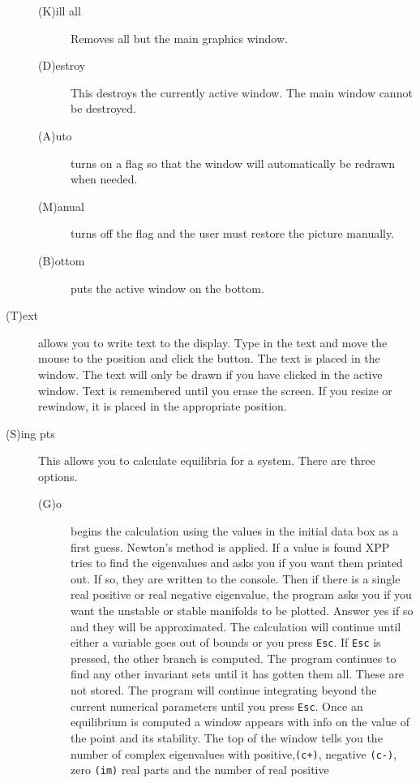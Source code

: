 \begin{description}
\begin{description}
\item[(K)ill all]  Removes all but the main graphics window.

\item[(D)estroy]  This destroys the currently active window.  The main window
 cannot be destroyed.  

\item[(A)uto] turns on a flag so that the window will automatically be
redrawn when needed.

\item[(M)anual] turns off the flag and the user must restore the picture manually.

\item[(B)ottom] puts the active window on the bottom.
\end{description}
\item[(T)ext] allows you to write text to the display.  Type in the text and move
 the mouse to the position and click the button.  The text is placed in the 
window.  The text will only be drawn if you have clicked in the active window.
  Text is remembered until you erase the screen.  If you resize or rewindow,
 it is placed in the appropriate position.
\item[(S)ing pts]  This allows you to calculate equilibria for a system. There
 are three options.
\begin{description} 
	\item[(G)o] begins the calculation   using the values in the initial 
data box as a first guess.  Newton's method is applied.  If a value is found XPP
 tries to find the eigenvalues and asks you if you want them printed out.  If so,
 they are written to the console.  Then if there is a single real positive or
 real negative eigenvalue, the program asks you if you want the unstable or
 stable manifolds to be plotted.  Answer yes if so and they will be
 approximated. The calculation will continue until either a variable
goes out
 of bounds or you press {\tt Esc}.  If {\tt Esc} is pressed, the other
branch is
 computed. 
 The program continues to find any other invariant sets until it has gotten 
them all.  These are not stored. The program will continue integrating
beyond the current numerical parameters until you press {\tt Esc}.
Once an 
equilibrium is computed a window 
appears with info on the value of the point and its stability.  The top of 
the window tells you the number of complex eigenvalues with positive,{\tt (c+)}, 
negative {\tt (c-)}, zero {\tt (im)}  real parts and the number of
real positive

\end{description}
\end{description}
